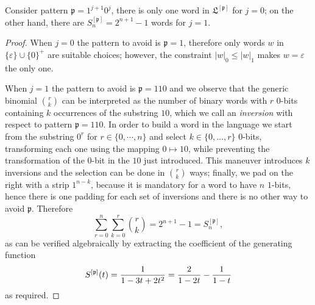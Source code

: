 \begin{corollary}
\label{coro:1_j1_0_j}
Consider pattern $\mathfrak{p}=1^{j+1}0^{j}$, there is only one word in
$\mathfrak{L}^{[\mathfrak{p}]}$ for $j=0$; on the other hand, there are
$S_{n}^{[\mathfrak{p}]} = 2^{n+1}-1$ words for $j=1$.
\end{corollary}

\begin{proof}
When $j=0$ the pattern to avoid is $\mathfrak{p}=1$, therefore only words
$w$ in $ \lbrace \varepsilon \rbrace\cup\lbrace 0 \rbrace^{+}$ are suitable choices;
however, the constraint $|w|_{0} \leq |w|_{1}$ makes $w = \varepsilon$ the only one.

When $j=1$ the pattern to avoid is $\mathfrak{p}=110$ and we observe that the
generic binomial ${{ {r}\choose{k}}}$ can be interpreted as the number of
binary words with $r$ $0$-bits  containing $k$ occurrences of the substring
$10$, which we call an \emph{inversion} with respect to pattern $\mathfrak{p}=110$.
In order to build a word in the language we start from the substring $0^{r}$ for
$r\in\lbrace 0,\cdots,n\rbrace$ and select $k\in \lbrace 0, \ldots,r
\rbrace$ $0$-bits, transforming each one using the mapping $0 \mapsto 10$,
while preventing the transformation of the $0$-bit in the $10$ just introduced. This
maneuver introduces $k$ inversions and the selection can be done in ${{
{r}\choose{k}}}$ ways; finally, we pad on the right with a strip $1^{n-k}$,  because it is mandatory for a word to have $n$
$1$-bits, hence there is one padding for each set of inversions and there is no other way to avoid $\mathfrak{p}$. Therefore
\begin{displaymath}
     \sum_{r=0}^{n}{\sum_{k=0}^{r}{{ {r}\choose{k}}}} = 2^{n+1}-1 = S_{n}^{[\mathfrak{p}]},
\end{displaymath}
as can be verified algebraically by extracting the coefficient of the generating function
$$S^{[\mathfrak{p}]}(t)={1 \over 1-3t+2t^2}={2 \over 1-2t}-{1 \over 1-t}$$
as required.
\end{proof}


